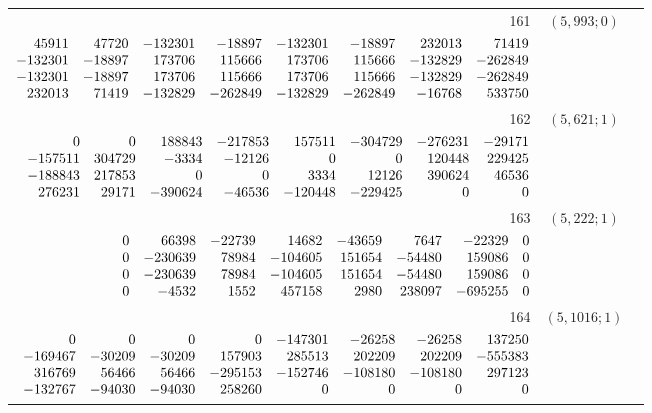 \documentclass[11pt]{article}
\theoremstyle{remark}
\numberwithin{equation}{section}
\begin{document}
\begin{longtable}{rcl}
161 & $(5,993;0)$ & \begin{tabular}[t]{@{}l@{}}$w_i=\displaystyle \frac{2764895030026724011}{513615251231758033920000000000000000000}$\\[3pt]{\scriptsize$\begin{array}{@{}rrrrrrrr@{}}45911 & 47720 & -132301 & -18897 & -132301 & -18897 & 232013 & 71419\\-132301 & -18897 & 173706 & 115666 & 173706 & 115666 & -132829 & -262849\\-132301 & -18897 & 173706 & 115666 & 173706 & 115666 & -132829 & -262849\\232013 & 71419 & -132829 & -262849 & -132829 & -262849 & -16768 & 533750\end{array}$}\end{tabular}\\[8pt]
162 & $(5,621;1)$ & \begin{tabular}[t]{@{}l@{}}$w_i=\displaystyle \frac{2832231999020026609}{447941081978825427484000000000000000}$\\[3pt]{\scriptsize$\begin{array}{@{}rrrrrrrr@{}}0 & 0 & 188843 & -217853 & 157511 & -304729 & -276231 & -29171\\-157511 & 304729 & -3334 & -12126 & 0 & 0 & 120448 & 229425\\-188843 & 217853 & 0 & 0 & 3334 & 12126 & 390624 & 46536\\276231 & 29171 & -390624 & -46536 & -120448 & -229425 & 0 & 0\end{array}$}\end{tabular}\\[8pt]
163 & $(5,222;1)$ & \begin{tabular}[t]{@{}l@{}}$w_i=\displaystyle \frac{1651360652845839501}{414177332265327222200000000000000000}$\\[3pt]{\scriptsize$\begin{array}{@{}rrrrrrrr@{}}0 & 66398 & -22739 & 14682 & -43659 & 7647 & -22329 & 0\\0 & -230639 & 78984 & -104605 & 151654 & -54480 & 159086 & 0\\0 & -230639 & 78984 & -104605 & 151654 & -54480 & 159086 & 0\\0 & -4532 & 1552 & 457158 & 2980 & 238097 & -695255 & 0\end{array}$}\end{tabular}\\[8pt]
164 & $(5,1016;1)$ & \begin{tabular}[t]{@{}l@{}}$w_i=\displaystyle \frac{339238114973793401}{305946580586819220000000000000000000}$\\[3pt]{\scriptsize$\begin{array}{@{}rrrrrrrr@{}}0 & 0 & 0 & 0 & -147301 & -26258 & -26258 & 137250\\-169467 & -30209 & -30209 & 157903 & 285513 & 202209 & 202209 & -555383\\316769 & 56466 & 56466 & -295153 & -152746 & -108180 & -108180 & 297123\\-132767 & -94030 & -94030 & 258260 & 0 & 0 & 0 & 0\end{array}$}\end{tabular}\\[8pt]

\end{longtable}
\end{document}
